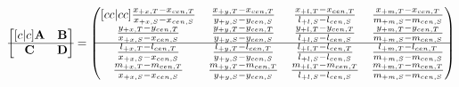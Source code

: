 \label{sec:appc}
\begin{equation}
\centering
    \begin{bmatrix}[c | c]
        \mathbf{A} & \mathbf{B} \\
        \hline
        \mathbf{C} & \mathbf{D} \\
    \end{bmatrix} =
    \renewcommand\arraystretch{1}
    \begin{pmatrix}[c c | c c]
        \frac{x_{+x,T} - x_{cen,T}}{x_{+x,S} - x_{cen,S}} & \frac{x_{+y,T} - x_{cen,T}}{y_{+y,S} - y_{cen,S}} & \frac{x_{+l,T} - x_{cen,T}}{l_{+l,S} - l_{cen,S}} & 
        \frac{x_{+m,T} - x_{cen,T}}{m_{+m,S} - m_{cen,S}} \\
        \frac{y_{+x,T} - y_{cen,T}}{x_{+x,S} - x_{cen,S}} & \frac{y_{+y,T} - y_{cen,T}}{y_{+y,S} - y_{cen,S}} & \frac{y_{+l,T} - y_{cen,T}}{l_{+l,S} - l_{cen,S}} & 
        \frac{y_{+m,T} - y_{cen,T}}{m_{+m,S} - m_{cen,S}} \\
        \hline 
        \frac{l_{+x,T} - l_{cen,T}}{x_{+x,S} - x_{cen,S}} & \frac{l_{+y,T} - l_{cen,T}}{y_{+y,S} - y_{cen,S}} & \frac{l_{+l,T} - l_{cen,T}}{l_{+l,S} - l_{cen,S}} & 
        \frac{l_{+m,T} - l_{cen,T}}{m_{+m,S} - m_{cen,S}}\\
        \frac{m_{+x,T} - m_{cen,T}}{x_{+x,S} - x_{cen,S}} & \frac{m_{+y,T} - m_{cen,T}}{y_{+y,S} - y_{cen,S}} & \frac{m_{+l,T} - m_{cen,T}}{l_{+l,S} - l_{cen,S}} & 
        \frac{m_{+m,T} - m_{cen,T}}{m_{+m,S} - m_{cen,S}} \\
    \end{pmatrix}
\label{eq:total_abcd_matrix}
\end{equation}

